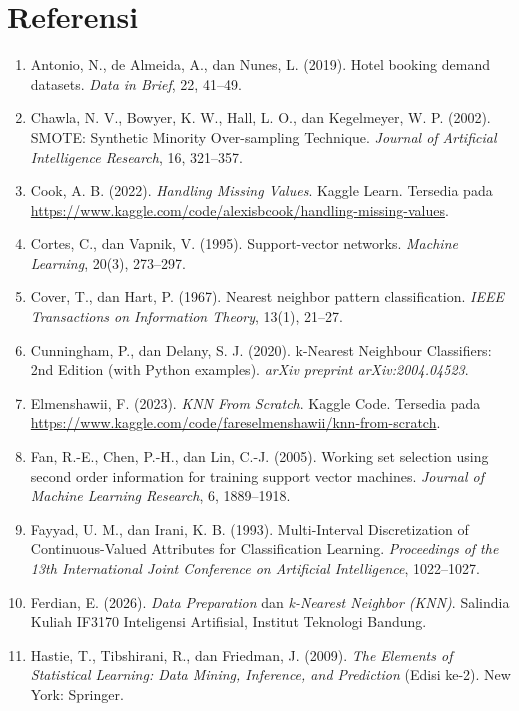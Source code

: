 {}
\section*{Referensi}

\begin{enumerate}
  \item Antonio, N., de Almeida, A., dan Nunes, L. (2019). Hotel booking demand datasets. \textit{Data in Brief}, 22, 41--49.
  \item Chawla, N. V., Bowyer, K. W., Hall, L. O., dan Kegelmeyer, W. P. (2002). SMOTE: Synthetic Minority Over-sampling Technique. \textit{Journal of Artificial Intelligence Research}, 16, 321--357.
  \item Cook, A. B. (2022). \textit{Handling Missing Values}. Kaggle Learn. Tersedia pada \url{https://www.kaggle.com/code/alexisbcook/handling-missing-values}.
  \item Cortes, C., dan Vapnik, V. (1995). Support-vector networks. \textit{Machine Learning}, 20(3), 273--297.
  \item Cover, T., dan Hart, P. (1967). Nearest neighbor pattern classification. \textit{IEEE Transactions on Information Theory}, 13(1), 21--27.
  \item Cunningham, P., dan Delany, S. J. (2020). k-Nearest Neighbour Classifiers: 2nd Edition (with Python examples). \textit{arXiv preprint arXiv:2004.04523}.
  \item Elmenshawii, F. (2023). \textit{KNN From Scratch}. Kaggle Code. Tersedia pada \url{https://www.kaggle.com/code/fareselmenshawii/knn-from-scratch}.
  \item Fan, R.-E., Chen, P.-H., dan Lin, C.-J. (2005). Working set selection using second order information for training support vector machines. \textit{Journal of Machine Learning Research}, 6, 1889--1918.
  \item Fayyad, U. M., dan Irani, K. B. (1993). Multi-Interval Discretization of Continuous-Valued Attributes for Classification Learning. \textit{Proceedings of the 13th International Joint Conference on Artificial Intelligence}, 1022--1027.
  \item Ferdian, E. (2026). \textit{Data Preparation} dan \textit{k-Nearest Neighbor (KNN)}. Salindia Kuliah IF3170 Inteligensi Artifisial, Institut Teknologi Bandung.
  \item Hastie, T., Tibshirani, R., dan Friedman, J. (2009). \textit{The Elements of Statistical Learning: Data Mining, Inference, and Prediction} (Edisi ke-2). New York: Springer.

\end{enumerate}
